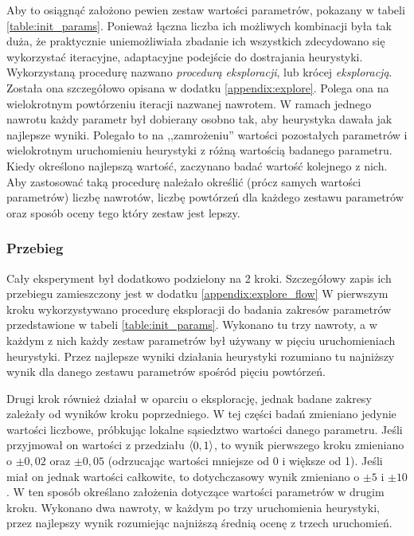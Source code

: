 \documentclass[./FM_mgr.tex]{subfiles}
\begin{document}
Aby to osiągnąć założono pewien zestaw wartości parametrów, pokazany w tabeli \ref{table:init_params}.
Ponieważ łączna liczba ich możliwych kombinacji była tak duża, że praktycznie uniemożliwiała zbadanie ich wszystkich zdecydowano się wykorzystać iteracyjne, adaptacyjne podejście do dostrajania heurystyki.
Wykorzystaną procedurę nazwano \emph{procedurą eksploracji}, lub krócej \emph{eksploracją}.
Została ona szczegółowo opisana w dodatku \ref{appendix:explore}.
Polega ona na wielokrotnym powtórzeniu iteracji nazwanej nawrotem.
W ramach jednego nawrotu każdy parametr był dobierany osobno tak, aby heurystyka dawała jak najlepsze wyniki.
Polegało to na ,,zamrożeniu'' wartości pozostałych parametrów i wielokrotnym uruchomieniu heurystyki z różną wartością badanego parametru.
Kiedy określono najlepszą wartość, zaczynano badać wartość kolejnego z nich.
Aby zastosować taką procedurę należało określić (prócz samych wartości parametrów) liczbę nawrotów, liczbę powtórzeń dla każdego zestawu parametrów oraz sposób oceny tego który zestaw jest lepszy.

\subsubsection*{Przebieg}
Cały eksperyment był dodatkowo podzielony na 2 kroki. 
Szczegółowy zapis ich przebiegu zamieszczony jest w dodatku \ref{appendix:explore_flow}
W pierwszym kroku wykorzystywano procedurę eksploracji do badania zakresów parametrów przedstawione w tabeli \ref{table:init_params}.
Wykonano tu trzy nawroty, a w każdym z nich każdy zestaw parametrów był używany w pięciu uruchomieniach heurystyki.
Przez najlepsze wyniki działania heurystyki rozumiano tu najniższy wynik dla danego zestawu parametrów spośród pięciu powtórzeń.

Drugi krok również działał w oparciu o eksplorację, jednak badane zakresy  zależały od wyników kroku poprzedniego.
W tej części badań zmieniano jedynie wartości liczbowe, próbkując lokalne sąsiedztwo wartości danego parametru.
Jeśli przyjmował on wartości z przedziału $\langle0, 1\rangle$, to wynik pierwszego kroku zmieniano o $\pm0,02$ oraz $\pm0,05$ (odrzucając wartości mniejsze od 0 i większe od 1).
Jeśli miał on jednak wartości całkowite, to dotychczasowy wynik zmieniano o $\pm5$ i $\pm10$.
W ten sposób określano założenia dotyczące wartości parametrów w drugim kroku.
Wykonano dwa nawroty, w każdym po trzy uruchomienia heurystyki, przez najlepszy wynik rozumiejąc najniższą średnią ocenę z trzech uruchomień.
\end{document}
